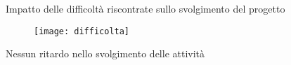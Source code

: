 \begin{tframe}{Impatto delle difficoltà riscontrate sullo svolgimento del progetto}
\begin{figure}[h]
\centering
\texttt{[image: difficolta]}
\end{figure}
\begin{center}
\alert{Nessun ritardo} nello svolgimento delle attività
\end{center}
\end{tframe}